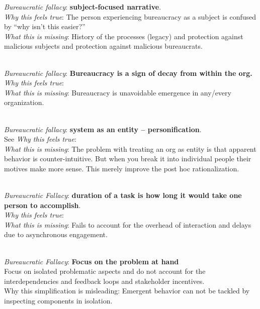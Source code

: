 \textit{Bureaucratic fallacy}: \textbf{subject-focused narrative}. \\
\textit{Why this feels true}: The person experiencing bureaucracy as a subject is confused by ``why isn't this easier?''  \\
\textit{What this is missing}: History of the processes (legacy) and protection against malicious subjects and protection against malicious bureaucrats. 

\ \\

\textit{Bureaucratic fallacy}: \textbf{Bureaucracy is a sign of decay from within the org.} \\
\textit{Why this feels true}: \\
\textit{What this is missing}: Bureaucracy is unavoidable emergence in any/every organization.

\ \\

\textit{Bureaucratic fallacy}: \textbf{system as an entity -- personification}. \\
See \cite{2002_Gall}
\textit{Why this feels true}: \\
\textit{What this is missing}: The problem with treating an org as entity is that apparent behavior is counter-intuitive. But when you break it into individual people their motives make more sense. This merely improve the post hoc rationalization. 

\ \\

\textit{Bureaucratic Fallacy}: \textbf{duration of a task is how long it would take one person to accomplish}.  \\
\textit{Why this feels true}: \\
\textit{What this is missing}: Fails to account for the overhead of interaction and delays due to asynchronous engagement.

\ \\

\textit{Bureaucratic Fallacy}: \textbf{Focus on the problem at hand}\\
Focus on isolated problematic aspects and do not account for the interdependencies and feedback loops and stakeholder incentives. \\
Why this simplification is misleading: Emergent behavior can not be tackled by inspecting components in isolation.

\ \\

